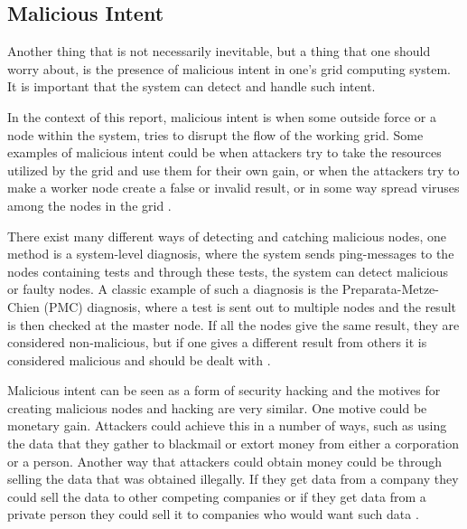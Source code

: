 \subsection{Malicious Intent}
Another thing that is not necessarily inevitable, but a thing that one should worry about, is the presence of malicious intent in one's grid computing system. It is important that the system can detect and handle such intent.

In the context of this report, malicious intent is when some outside force or a node within the system, tries to disrupt the flow of the working grid. Some examples of malicious intent could be when attackers try to take the resources utilized by the grid and use them for their own gain, or when the attackers try to make a worker node create a false or invalid result, or in some way spread viruses among the nodes in the grid \cite{detecting_malicious_manipulation}.

There exist many different ways of detecting and catching malicious nodes, one method is a system-level diagnosis, where the system sends ping-messages to the nodes containing tests and through these tests, the system can detect malicious or faulty nodes. A classic example of such a diagnosis is the Preparata-Metze-Chien (PMC) diagnosis, where a test is sent out to multiple nodes and the result is then checked at the master node. If all the nodes give the same result, they are considered non-malicious, but if one gives a different result from others it is considered malicious and should be dealt with \cite{detecting_malicious_manipulation}.

Malicious intent can be seen as a form of security hacking and the motives for creating malicious nodes and hacking are very similar. One motive could be monetary gain. Attackers could achieve this in a number of ways, such as using the data that they gather to blackmail or extort money from either a corporation or a person. Another way that attackers could obtain money could be through selling the data that was obtained illegally. If they get data from a company they could sell the data to other competing companies or if they get data from a private person they could sell it to companies who would want such data \cite{why_do_hackers_hack}.